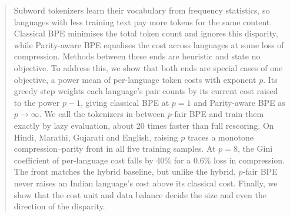 \begin{abstract}
Subword tokenizers learn their vocabulary from frequency statistics, so languages with
less training text pay more tokens for the same content. Classical BPE minimises the total
token count and ignores this disparity, while Parity-aware BPE equalises the cost across
languages at some loss of compression. Methods between these ends are heuristic and
state no objective. To address this, we show that both ends
are special cases of one objective, a power mean of per-language token costs with exponent
$p$. Its greedy step weights each language's pair counts by its current cost raised to the
power $p-1$, giving classical BPE at $p=1$ and Parity-aware BPE as $p\to\infty$. We call the
tokenizers in between $p$-fair BPE and train them exactly by lazy evaluation, about 20 times
faster than full rescoring. On Hindi, Marathi, Gujarati and English, raising $p$
traces a monotone compression--parity front in all five training samples. At $p=8$, the
Gini coefficient of per-language cost falls by 40\% for a 0.6\% loss in compression. The
front matches the hybrid baseline, but unlike the hybrid, $p$-fair BPE never raises an
Indian language's cost above its classical cost. Finally, we show that the cost unit and
data balance decide the size and even the direction of the disparity.
\end{abstract}